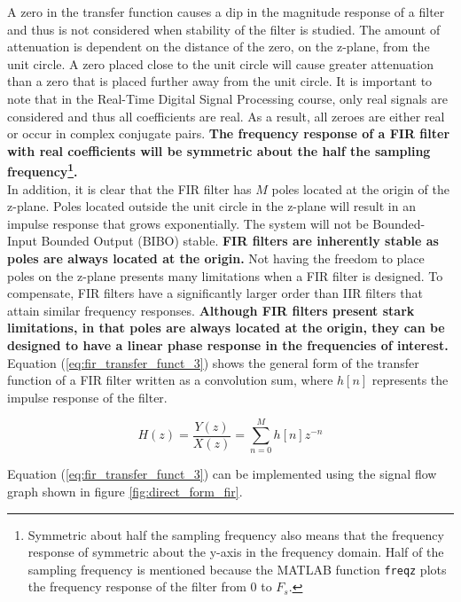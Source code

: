 \documentclass{article}
\begin{document}
A zero in the transfer function causes a dip in the magnitude response of a filter and thus is not considered when stability of the filter is studied. The amount of attenuation is dependent on the distance of the zero, on the z-plane, from the unit circle. A zero placed close to the unit circle will cause greater attenuation than a zero that is placed further away from the unit circle. It is important to note that in the Real-Time Digital Signal Processing course, only real signals are considered and thus all coefficients are real. As a result, all zeroes are either real or occur in complex conjugate pairs. \textbf{The frequency response of a FIR filter with real coefficients will be symmetric about the half the sampling frequency\footnote{Symmetric about half the sampling frequency also means that the frequency response of symmetric about the y-axis in the frequency domain. Half of the sampling frequency is mentioned because the MATLAB function {\tt freqz} plots the frequency response of the filter from $0$ to $F_{s}$.}.} \\

In addition, it is clear that the FIR filter has $M$ poles located at the origin of the z-plane. Poles located outside the unit circle in the z-plane will result in an impulse response that grows exponentially. The system will not be Bounded-Input Bounded Output (BIBO) stable. \textbf{FIR filters are inherently stable as poles are always located at the origin.} Not having the freedom to place poles on the z-plane presents many limitations when a FIR filter is designed. To compensate, FIR filters have a significantly larger order than IIR filters that attain similar frequency responses. \textbf{Although FIR filters present stark limitations, in that poles are always located at the origin, they can be designed to have a linear phase response in the frequencies of interest.}\\

Equation (\ref{eq:fir_transfer_funct_3}) shows the general form of the transfer function of a FIR filter written as a convolution sum, where $h[n]$ represents the impulse response of the filter.

\begin{equation}\label{eq:fir_transfer_funct_3}
    H(z) = \frac{Y(z)}{X(z)} = \sum_{n=0}^{M}h[n]z^{-n}
\end{equation}

Equation (\ref{eq:fir_transfer_funct_3}) can be implemented using the signal flow graph shown in figure \ref{fig:direct_form_fir}.
\end{document}
